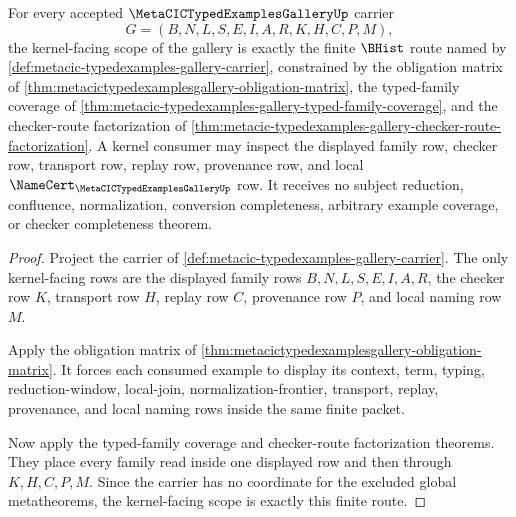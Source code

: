 \begin{theorem}
\label{thm:metacic-typed-examples-gallery-kernel-scope}
For every accepted $\MetaCICTypedExamplesGalleryUp$ carrier
$$
G=(B,N,L,S,E,I,A,R,K,H,C,P,M),
$$
the kernel-facing scope of the gallery is exactly the finite $\BHist$ route named by \autoref{def:metacic-typedexamples-gallery-carrier}, constrained by the obligation matrix of \autoref{thm:metacictypedexamplesgallery-obligation-matrix}, the typed-family coverage of \autoref{thm:metacic-typedexamples-gallery-typed-family-coverage}, and the checker-route factorization of \autoref{thm:metacic-typedexamples-gallery-checker-route-factorization}. A kernel consumer may inspect the displayed family row, checker row, transport row, replay row, provenance row, and local $\NameCert_{\MetaCICTypedExamplesGalleryUp}$ row. It receives no subject reduction, confluence, normalization, conversion completeness, arbitrary example coverage, or checker completeness theorem.
\end{theorem}
\begin{proof}
Project the carrier of \autoref{def:metacic-typedexamples-gallery-carrier}. The only kernel-facing rows are the displayed family rows $B,N,L,S,E,I,A,R$, the checker row $K$, transport row $H$, replay row $C$, provenance row $P$, and local naming row $M$.

Apply the obligation matrix of \autoref{thm:metacictypedexamplesgallery-obligation-matrix}. It forces each consumed example to display its context, term, typing, reduction-window, local-join, normalization-frontier, transport, replay, provenance, and local naming rows inside the same finite packet.

Now apply the typed-family coverage and checker-route factorization theorems. They place every family read inside one displayed row and then through $K,H,C,P,M$. Since the carrier has no coordinate for the excluded global metatheorems, the kernel-facing scope is exactly this finite route.
\end{proof}

